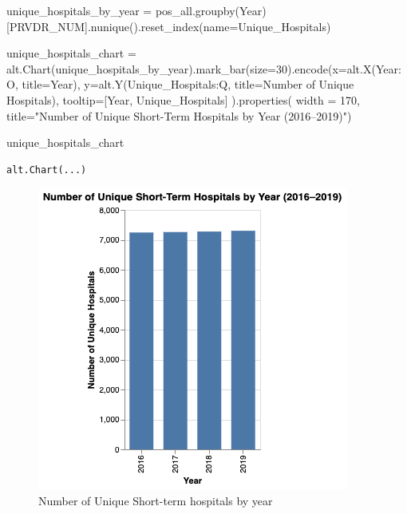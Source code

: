 \documentclass[
  letterpaper,
  DIV=11,
  numbers=noendperiod]{scrartcl}
\newenvironment{Shaded}{\begin{snugshade}}{\end{snugshade}}
\newcommand{\DecValTok}[1]{\textcolor[rgb]{0.68,0.00,0.00}{#1}}
\newcommand{\NormalTok}[1]{\textcolor[rgb]{0.00,0.23,0.31}{#1}}
\newcommand{\OperatorTok}[1]{\textcolor[rgb]{0.37,0.37,0.37}{#1}}
\newcommand{\StringTok}[1]{\textcolor[rgb]{0.13,0.47,0.30}{#1}}
\begin{document}
\begin{Shaded}
\begin{Highlighting}[]
\NormalTok{unique\_hospitals\_by\_year }\OperatorTok{=}\NormalTok{ pos\_all.groupby(}\StringTok{\textquotesingle{}Year\textquotesingle{}}\NormalTok{)[}\StringTok{\textquotesingle{}PRVDR\_NUM\textquotesingle{}}\NormalTok{].nunique().reset\_index(name}\OperatorTok{=}\StringTok{\textquotesingle{}Unique\_Hospitals\textquotesingle{}}\NormalTok{)}


\NormalTok{unique\_hospitals\_chart }\OperatorTok{=}\NormalTok{ alt.Chart(unique\_hospitals\_by\_year).mark\_bar(size}\OperatorTok{=}\DecValTok{30}\NormalTok{).encode(x}\OperatorTok{=}\NormalTok{alt.X(}\StringTok{\textquotesingle{}Year:O\textquotesingle{}}\NormalTok{, title}\OperatorTok{=}\StringTok{\textquotesingle{}Year\textquotesingle{}}\NormalTok{),  }
\NormalTok{y}\OperatorTok{=}\NormalTok{alt.Y(}\StringTok{\textquotesingle{}Unique\_Hospitals:Q\textquotesingle{}}\NormalTok{, title}\OperatorTok{=}\StringTok{\textquotesingle{}Number of Unique Hospitals\textquotesingle{}}\NormalTok{),}
\NormalTok{    tooltip}\OperatorTok{=}\NormalTok{[}\StringTok{\textquotesingle{}Year\textquotesingle{}}\NormalTok{, }\StringTok{\textquotesingle{}Unique\_Hospitals\textquotesingle{}}\NormalTok{] ).properties(}
\NormalTok{        width }\OperatorTok{=} \DecValTok{170}\NormalTok{,}
\NormalTok{         title}\OperatorTok{=}\StringTok{"Number of Unique Short{-}Term Hospitals by Year (2016–2019)"}\NormalTok{)}

\NormalTok{unique\_hospitals\_chart}
\end{Highlighting}
\end{Shaded}

\begin{verbatim}
alt.Chart(...)
\end{verbatim}

\begin{figure}[H]

{\centering \includegraphics{1-4.png}

}

\caption{Number of Unique Short-term hospitals by year}

\end{figure}%
\end{document}
